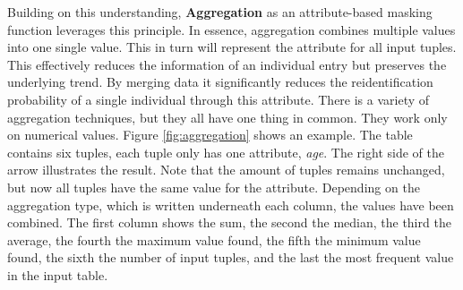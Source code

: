 Building on this understanding, \textbf{Aggregation} as an attribute-based masking function leverages this principle. In essence, aggregation combines multiple values into one single value. This in turn will represent the attribute for all input tuples. This effectively reduces the information of an individual entry but preserves the underlying trend. By merging data it significantly reduces the reidentification probability of a single individual through this attribute. There is a variety of aggregation techniques, but they all have one thing in common. They work only on numerical values. Figure \ref{fig:aggregation} shows an example. The table contains six tuples, each tuple only has one attribute, \textit{age}. The right side of the arrow illustrates the result. Note that the amount of tuples remains unchanged, but now all tuples have the same value for the attribute. Depending on the aggregation type, which is written underneath each column, the values have been combined. The first column shows the sum, the second the median, the third the average, the fourth the maximum value found, the fifth the minimum value found, the sixth the number of input tuples, and the last the most frequent value in the input table. 

\bigskip

